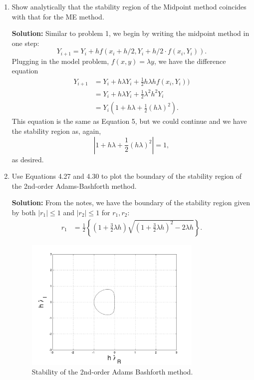 \documentclass[11pt]{article}
\def\f{\frac }
\begin{document}
\begin{enumerate}
\clearpage
\newpage
\item Show analytically that the stability region of the Midpoint method coincides with that for the ME method.

\textbf{Solution:} Similar to problem 1, we begin by writing the midpoint method in one step:
\begin{equation} Y_{i+1} = Y_i + hf(x_i+h/2,Y_i + h/2\cdot f(x_i, Y_i)) .\end{equation}
Plugging in the model problem, $f(x,y) = \lambda y$, we have the difference equation
\begin{align} Y_{i+1} &= Y_i + h \lambda Y_i + \f{1}{2} h \lambda h f(x_i, Y_i))\\
&= Y_i + h  \lambda Y_i + \f{1}{2} \lambda^2 h^2 Y_i \\
&= Y_i \left( 1 + h  \lambda + \f{1}{2} (h\lambda)^2 \right ) \label{prb3eq1}.\end{align}
This equation is the same as Equation 5, but we could continue and we have the stability region as, again,
\begin{equation} \left | 1 + h  \lambda + \f{1}{2} (h\lambda)^2 \right | = 1 ,\end{equation}
as desired.

\clearpage
\newpage
\item Use Equations 4.27 and 4.30 to plot the boundary of the stability region of the 2nd-order Adams-Bashforth method.

\textbf{Solution:} From the notes, we have the boundary of the stability region given by both $| r_1 | \leq 1$ and $| r_2 | \leq 1$ for $r_1,r_2$:
\begin{align} r_1 &= \f{1}{2} \left \{ \left ( 1+ \frac{3}{2} \lambda h \right ) \sqrt{\left ( 1 + \f{3}{2} \lambda h \right ) ^2 - 2\lambda h } \right \} . \end{align}



\begin{figure}[h!]
  \centering
    \includegraphics[width=0.8\textwidth]{andy_hw04_prb04_02.png}
  \caption{Stability of the 2nd-order Adams Bashforth method.}
\end{figure}


\end{enumerate}
\end{document}
